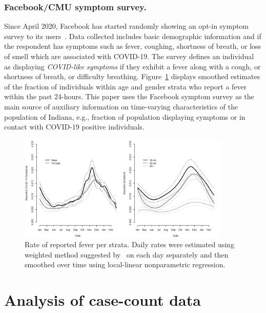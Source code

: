\documentclass[11pt]{amsart}
\numberwithin{equation}{section}
\theoremstyle{plain}
\begin{document}
\subsubsection{Facebook/CMU symptom survey.}
\label{subsection:fbsymptom}
Since April 2020, Facebook has started randomly showing an opt-in symptom survey to its users~\citep{delphisurvey}.  Data collected includes basic demographic information and if the respondent has symptoms such as fever, coughing, shortness of breath, or loss of smell which are associated with COVID-19.  The survey defines an individual as displaying \emph{COVID-like symptoms} if they exhibit a fever along with a cough, or shortness of breath, or difficulty breathing.  Figure~\ref{fig:fbsymptoms} displays smoothed estimates of the fraction of individuals within age and gender strata who report a fever within the past 24-hours.  This paper uses the Facebook symptom survey as the main source of auxiliary information on time-varying characteristics of the population of Indiana, e.g., fraction of population displaying symptoms or in contact with COVID-19 positive individuals.

\begin{figure}[!th]
\centering
\includegraphics[width = 0.9\textwidth]{../figs/fbcovid19symptoms.png}
\caption{Rate of reported fever per strata.  Daily rates were estimated using weighted method suggested by~\citep{delphisurvey} on each day separately and then smoothed over time using local-linear nonparametric regression.}
\label{fig:fbsymptoms}
\vspace{-0.3cm}
\end{figure}


\section{Analysis of case-count data}
\label{section:casecount}
\end{document}
